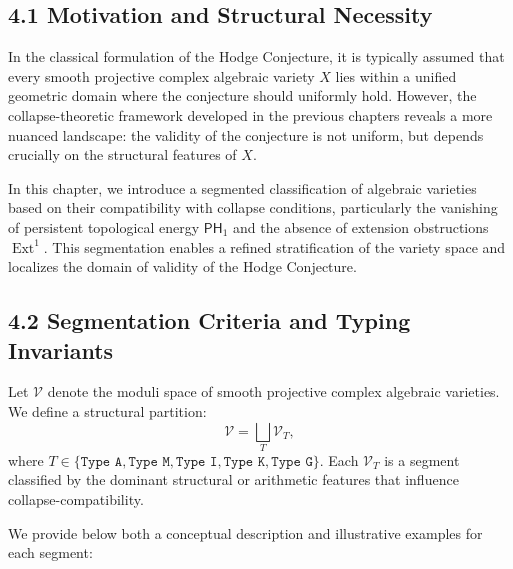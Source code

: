 \documentclass[11pt]{article}
\DeclareMathOperator{\Ext}{Ext}
\begin{document}
\subsection{4.1 Motivation and Structural Necessity}

In the classical formulation of the Hodge Conjecture, it is typically assumed that every smooth projective complex algebraic variety $X$ lies within a unified geometric domain where the conjecture should uniformly hold. However, the collapse-theoretic framework developed in the previous chapters reveals a more nuanced landscape: the validity of the conjecture is not uniform, but depends crucially on the structural features of $X$.

In this chapter, we introduce a segmented classification of algebraic varieties based on their compatibility with collapse conditions, particularly the vanishing of persistent topological energy $\mathsf{PH}_1$ and the absence of extension obstructions $\Ext^1$. This segmentation enables a refined stratification of the variety space and localizes the domain of validity of the Hodge Conjecture.

\subsection{4.2 Segmentation Criteria and Typing Invariants}

Let $\mathcal{V}$ denote the moduli space of smooth projective complex algebraic varieties. We define a structural partition:
\[
\mathcal{V} = \bigsqcup_{T} \mathcal{V}_T,
\]
where $T \in \{ \texttt{Type A}, \texttt{Type M}, \texttt{Type I}, \texttt{Type K}, \texttt{Type G} \}$. Each $\mathcal{V}_T$ is a segment classified by the dominant structural or arithmetic features that influence collapse-compatibility.

We provide below both a conceptual description and illustrative examples for each segment:
\end{document}
